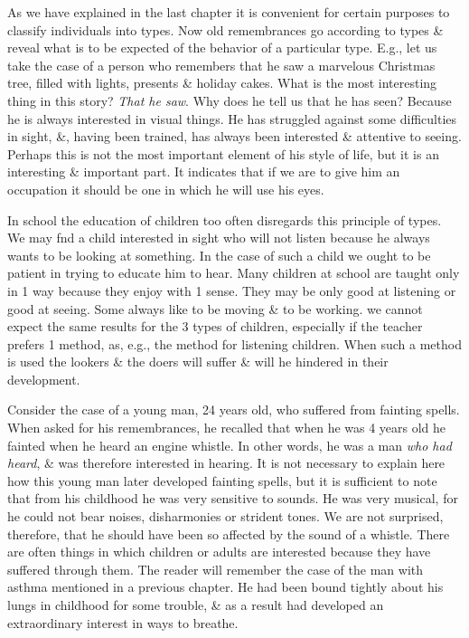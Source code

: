 \documentclass{article}
\numberwithin{equation}{section}
\begin{document}
As we have explained in the last chapter it is convenient for certain purposes to classify individuals into types. Now old remembrances go according to types \& reveal what is to be expected of the behavior of a particular type. E.g., let us take the case of a person who remembers that he saw a marvelous Christmas tree, filled with lights, presents \& holiday cakes. What is the most interesting thing in this story? \textit{That he saw}. Why does he tell us that he has seen? Because he is always interested in visual things. He has struggled against some difficulties in sight, \&, having been trained, has always been interested \& attentive to seeing. Perhaps this is not the most important element of his style of life, but it is an interesting \& important part. It indicates that if we are to give him an occupation it should be one in which he will use his eyes.

In school the education of children too often disregards this principle of types. We may fnd a child interested in sight who will not listen because he always wants to be looking at something. In the case of such a child we ought to be patient in trying to educate him to hear. Many children at school are taught only in 1 way because they enjoy with 1 sense. They may be only good at listening or good at seeing. Some always like to be moving \& to be working. we cannot expect the same results for the 3 types of children, especially if the teacher prefers 1 method, as, e.g., the method for listening children. When such a method is used the lookers \& the doers will suffer \& will he hindered in their development.

Consider the case of a young man, 24 years old, who suffered from fainting spells. When asked for his remembrances, he recalled that when he was 4 years old he fainted when he heard an engine whistle. In other words, he was a man \textit{who had heard}, \& was therefore interested in hearing. It is not necessary to explain here how this young man later developed fainting spells, but it is sufficient to note that from his childhood he was very sensitive to sounds. He was very musical, for he could not bear noises, disharmonies or strident tones. We are not surprised, therefore, that he should have been so affected by the sound of a whistle. There are often things in which children or adults are interested because they have suffered through them. The reader will remember the case of the man with asthma mentioned in a previous chapter. He had been bound tightly about his lungs in childhood for some trouble, \& as a result had developed an extraordinary interest in ways to breathe.
\end{document}
